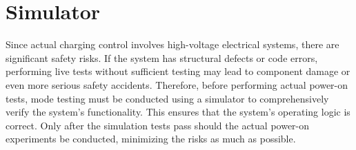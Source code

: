 \documentclass[
english,
ruledheaders=section,%
class=report,%
thesis={type=Report},%
accentcolor=9c,%
custommargins=true,%
marginpar=false,%
parskip=half-,%
fontsize=11pt,%
logofile={img/tuda_logo.pdf}, %
]{tudapub}
\begin{document}
        \section{Simulator}
        \label{sec:Simulator}
        Since actual charging control involves high-voltage electrical systems, there are significant safety risks. If the system has structural defects or code errors, performing live tests without sufficient testing may lead to component damage or even more serious safety accidents. Therefore, before performing actual power-on tests, mode testing must be conducted using a simulator to comprehensively verify the system's functionality. This ensures that the system's operating logic is correct. Only after the simulation tests pass should the actual power-on experiments be conducted, minimizing the risks as much as possible.




\end{document}
